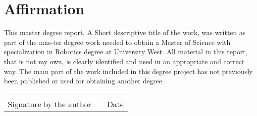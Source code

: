 
\clearpage


\pagestyle{fancy}
\fancyhead{} %

\section*{Affirmation}
This master degree report, A Short descriptive title of the work, was written as part of the mas-ter degree work needed to obtain a Master of Science with specialization in Robotics degree at University West. All material in this report, that is not my own, is clearly identified and used in an appropriate and correct way. The main part of the work included in this degree project has not previously been published or used for obtaining another degree. 

\vspace{5.0cm}

\vspace{25mm}
    \begin{tabular}{p{10cm} p{2cm} p{2cm}}
    \hrulefill & & \hrulefill\\
    Signature by the author & & Date\\
    \end{tabular}
    
\setlength\parindent{5pt}
\vspace{8mm} \myName